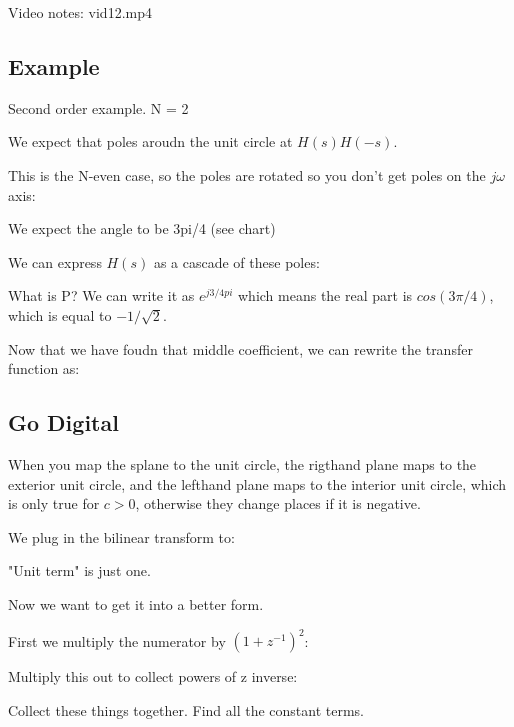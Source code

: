 Video notes: vid12.mp4

\subsection*{Example}
Second order example.  N = 2

We expect that poles aroudn the unit circle at $H(s)H(-s)$.

This is the N-even case, so the poles are rotated so you don't get 
poles on the $j\omega$ axis:

We expect the angle to be 3pi/4 (see chart)


We can express $H(s)$ as a cascade of these poles:



What is P? We can write it as $e^{j3/4pi}$ which means the real part is
$cos(3\pi/4)$, which is equal to $-1/\sqrt{2}$. 


Now that we have foudn that middle coefficient, we can rewrite 
the transfer function as:


\subsection*{Go Digital}

When you map the splane to the unit circle, the rigthand plane maps
to the exterior unit circle, and the lefthand plane maps to the interior unit circle,
which is only true for $c > 0$, otherwise they change places if it is negative.


We plug in the bilinear transform to:


"Unit term" is just one. 

Now we want to get it into a better form. 

First we multiply the numerator by $(1 + z^{-1})^2$:


Multiply this out to collect powers of z inverse:


Collect these things together. Find all the constant terms. 

